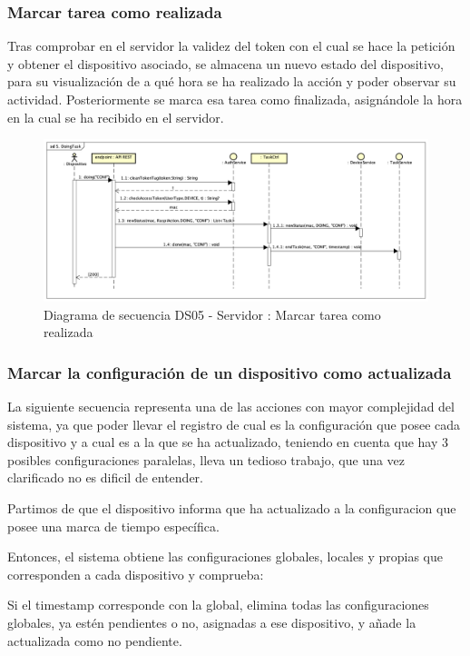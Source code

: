 \subsubsection{Marcar tarea como realizada}

Tras comprobar en el servidor la validez del token con el cual se hace la petición y obtener el dispositivo asociado, se almacena un nuevo estado del dispositivo, para su visualización de a qué hora se ha realizado la acción y poder observar su actividad. Posteriormente se marca esa tarea como finalizada, asignándole la hora en la cual se ha recibido en el servidor.

\begin{figure}[H]
    \centering
    \includegraphics[width=14cm]{./img/sequence/diagram/doingTask.png}
    \caption{Diagrama de secuencia DS05 - Servidor : Marcar tarea como realizada}
    \label{fig:seq.doing}
\end{figure}


\subsubsection{Marcar la configuración de un dispositivo como actualizada}

La siguiente secuencia representa una de las acciones con mayor complejidad del sistema, ya que poder llevar el registro de cual es la configuración que posee cada dispositivo y a cual es a la que se ha actualizado, teniendo en cuenta que hay 3 posibles configuraciones paralelas, lleva un tedioso trabajo, que una vez clarificado no es dificil de entender.

Partimos de que el dispositivo informa que ha actualizado a la configuracion que posee una marca de tiempo específica.

Entonces, el sistema obtiene las configuraciones globales, locales y propias que corresponden a cada dispositivo y comprueba:

Si el timestamp corresponde con la global, elimina todas las configuraciones globales, ya estén pendientes o no, asignadas a ese dispositivo, y añade la actualizada como no pendiente.

